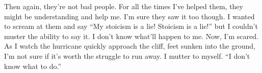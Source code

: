 \documentclass[a4paper, 12pt]{book}
\newcommand\tab[1][1cm]{\hspace*{#1}}
\begin{document}
\newline
\tab
Then again, they’re not bad people. For all the times I’ve helped them, they might be understanding and help me. I’m sure they saw it too though. I wanted to scream at them and say ``My stoicism is a lie! Stoicism is a lie!'' but I couldn’t muster the ability to say it. I don’t know what’ll happen to me. Now, I’m scared. As I watch the hurricane quickly approach the cliff, feet sunken into the ground, I’m not sure if it’s worth the struggle to run away. I mutter to myself. ``I don’t know what to do.''
\end{document}
